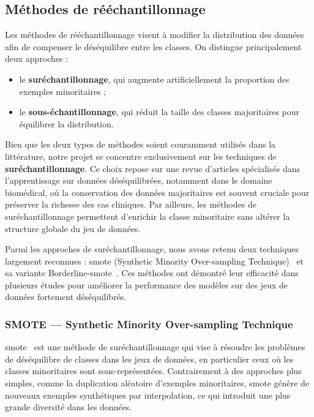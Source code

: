 \documentclass[12pt]{report}
\begin{document}
\subsection{Méthodes de rééchantillonnage}

Les méthodes de rééchantillonnage visent à modifier la distribution des données afin de compenser le déséquilibre entre les classes. On distingue principalement deux approches :
\begin{itemize}
    \item le \textbf{suréchantillonnage}, qui augmente artificiellement la proportion des exemples minoritaires ;
    \item le \textbf{sous-échantillonnage}, qui réduit la taille des classes majoritaires pour équilibrer la distribution.
\end{itemize}

Bien que les deux types de méthodes soient couramment utilisés dans la littérature, notre projet se concentre exclusivement sur les techniques de \textbf{suréchantillonnage}. Ce choix repose sur une revue d’articles spécialisés dans l’apprentissage sur données déséquilibrées, notamment dans le domaine biomédical, où la conservation des données majoritaires est souvent cruciale pour préserver la richesse des cas cliniques. Par ailleurs, les méthodes de suréchantillonnage permettent d’enrichir la classe minoritaire sans altérer la structure globale du jeu de données.

Parmi les approches de suréchantillonnage, nous avons retenu deux techniques largement reconnues : \gls{smote} (Synthetic Minority Over-sampling Technique)~\cite{chawla2002smote} et sa variante Borderline-\gls{smote}~\cite{han2005borderline}. Ces méthodes ont démontré leur efficacité dans plusieurs études pour améliorer la performance des modèles sur des jeux de données fortement déséquilibrés.

\subsubsection{SMOTE — \textbf{Synthetic Minority Over-sampling Technique}}

\gls{smote}~\cite{chawla2002smote} est une méthode de suréchantillonnage qui vise à résoudre les problèmes de déséquilibre de classes dans les jeux de données, en particulier ceux où les classes minoritaires sont sous-représentées. Contrairement à des approches plus simples, comme la duplication aléatoire d’exemples minoritaires, \gls{smote} génère de nouveaux exemples synthétiques par interpolation, ce qui introduit une plus grande diversité dans les données.
\end{document}
